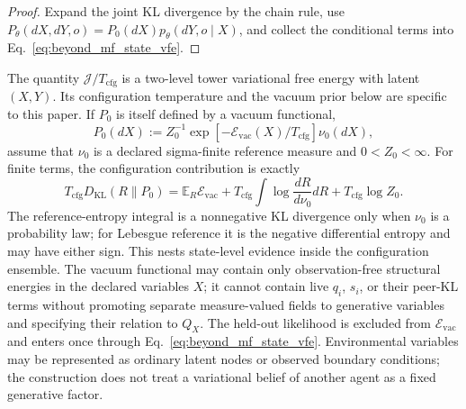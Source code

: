 \begin{proof}
Expand the joint KL divergence by the chain rule, use $P_\theta(dX,dY,o)=P_0(dX)p_\theta(dY,o\mid X)$, and collect the conditional terms into Eq.~\eqref{eq:beyond_mf_state_vfe}.
\end{proof}

The quantity $\mathcal{J}/T_{\mathrm{cfg}}$ is a two-level tower variational free energy with latent $(X,Y)$. Its configuration temperature and the vacuum prior below are specific to this paper. If $P_0$ is itself defined by a vacuum functional,
\begin{equation}
P_0(dX)
:=Z_0^{-1}\exp[-\mathcal{E}_{\mathrm{vac}}(X)/T_{\mathrm{cfg}}]\nu_0(dX),
\label{eq:beyond_mf_configuration_prior}
\end{equation}
assume that $\nu_0$ is a declared sigma-finite reference measure and $0<Z_0<\infty$. For finite terms, the configuration contribution is exactly
\[
T_{\mathrm{cfg}}D_{\mathrm{KL}}(R\|P_0)
=\mathbb E_R\mathcal E_{\mathrm{vac}}
+T_{\mathrm{cfg}}\int\log\frac{dR}{d\nu_0}dR
+T_{\mathrm{cfg}}\log Z_0.
\]
The reference-entropy integral is a nonnegative KL divergence only when $\nu_0$ is a probability law; for Lebesgue reference it is the negative differential entropy and may have either sign. This nests state-level evidence inside the configuration ensemble. The vacuum functional may contain only observation-free structural energies in the declared variables $X$; it cannot contain live $q_i$, $s_i$, or their peer-KL terms without promoting separate measure-valued fields to generative variables and specifying their relation to $Q_X$. The held-out likelihood is excluded from $\mathcal{E}_{\mathrm{vac}}$ and enters once through Eq.~\eqref{eq:beyond_mf_state_vfe}. Environmental variables may be represented as ordinary latent nodes or observed boundary conditions; the construction does not treat a variational belief of another agent as a fixed generative factor.

